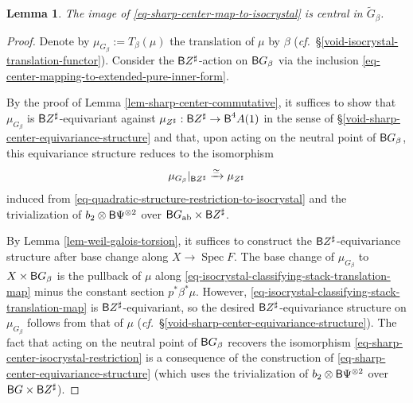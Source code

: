 \documentclass[10pt,english,reqno]{amsart}
\newcommand{\deloop}{\textnormal{\textsf{B}}}
\newcommand{\Spec}{\operatorname{Spec}}
\newcommand{\abelian}{\textnormal{ab}}
\newtheorem{lem}[subsubsection]{Lemma}
\theoremstyle{definition}
\numberwithin{equation}{section}
\begin{document}
\begin{lem}
\label{lem-sharp-center-isocrystal}
The image of \eqref{eq-sharp-center-map-to-isocrystal} is central in $\widetilde G_{\beta}$.
\end{lem}
\begin{proof}
Denote by $\mu_{G_{\beta}} := T_{\beta}(\mu)$ the translation of $\mu$ by $\beta$ (\emph{cf.}~\S\ref{void-isocrystal-translation-functor}). Consider the $\deloop Z^{\sharp}$-action on $\deloop G_{\beta}$ via the inclusion \eqref{eq-center-mapping-to-extended-pure-inner-form}.

By the proof of Lemma \ref{lem-sharp-center-commutative}, it suffices to show that $\mu_{G_{\beta}}$ is $\deloop Z^{\sharp}$-equivariant against $\mu_{Z^{\sharp}} : \deloop Z^{\sharp} \rightarrow \deloop^4A(1)$ in the sense of \S\ref{void-sharp-center-equivariance-structure} and that, upon acting on the neutral point of $\deloop G_{\beta}$, this equivariance structure reduces to the isomorphism
\begin{equation}
\label{eq-sharp-center-isocrystal-restriction}
\mu_{G_{\beta}}|_{\deloop Z^{\sharp}} \xrightarrow{\simeq} \mu_{Z^{\sharp}}
\end{equation}
induced from \eqref{eq-quadratic-structure-restriction-to-isocrystal} and the trivialization of $b_2\otimes \deloop\Psi^{\otimes 2}$ over $\deloop G_{\abelian} \times \deloop Z^{\sharp}$.

By Lemma \ref{lem-weil-galois-torsion}, it suffices to construct the $\deloop Z^{\sharp}$-equivariance structure after base change along $X \rightarrow \Spec F$. The base change of $\mu_{G_{\beta}}$ to $X\times\deloop G_{\beta}$ is the pullback of $\mu$ along \eqref{eq-isocrystal-classifying-stack-translation-map} minus the constant section $p^*\beta^*\mu$. However, \eqref{eq-isocrystal-classifying-stack-translation-map} is $\deloop Z^{\sharp}$-equivariant, so the desired $\deloop Z^{\sharp}$-equivariance structure on $\mu_{G_{\beta}}$ follows from that of $\mu$ (\emph{cf.}~\S\ref{void-sharp-center-equivariance-structure}). The fact that acting on the neutral point of $\deloop G_{\beta}$ recovers the isomorphism \eqref{eq-sharp-center-isocrystal-restriction} is a consequence of the construction of \eqref{eq-sharp-center-equivariance-structure} (which uses the trivialization of $b_2\otimes \deloop\Psi^{\otimes 2}$ over $\deloop G\times \deloop Z^{\sharp}$).
\end{proof}

\end{document}
